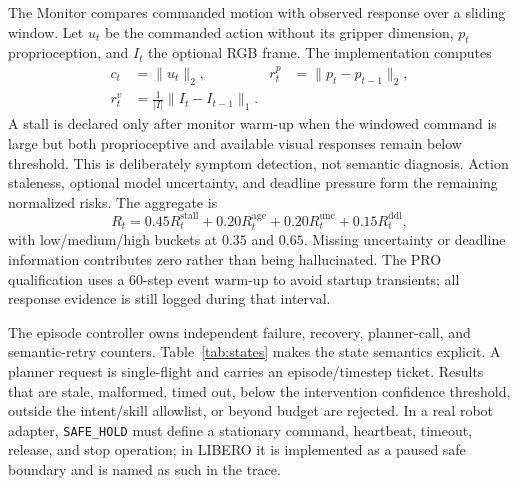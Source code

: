 \documentclass[runningheads]{waica}
\begin{document}
The Monitor compares commanded motion with observed response over a sliding
window. Let $u_t$ be the commanded action without its gripper dimension,
$p_t$ proprioception, and $I_t$ the optional RGB frame. The implementation
computes
\begin{align}
c_t &= \lVert u_t\rVert_2, &
r_t^p &= \lVert p_t-p_{t-1}\rVert_2,\\
r_t^v &= \frac{1}{|I|}\lVert I_t-I_{t-1}\rVert_1.
\end{align}
A stall is declared only after monitor warm-up when the windowed command is
large but both proprioceptive and available visual responses remain below
threshold. This is deliberately symptom detection, not semantic diagnosis.
Action staleness, optional model uncertainty, and deadline pressure form the
remaining normalized risks. The aggregate is
\begin{equation}
R_t = 0.45R_t^{\mathrm{stall}}+0.20R_t^{\mathrm{age}}
      +0.20R_t^{\mathrm{unc}}+0.15R_t^{\mathrm{ddl}},
\label{eq:risk}
\end{equation}
with low/medium/high buckets at $0.35$ and $0.65$. Missing uncertainty or
deadline information contributes zero rather than being hallucinated. The
PRO qualification uses a 60-step event warm-up to avoid startup transients;
all response evidence is still logged during that interval.

The episode controller owns independent failure, recovery, planner-call, and
semantic-retry counters. Table~\ref{tab:states} makes the state semantics
explicit. A planner request is single-flight and carries an episode/timestep
ticket. Results that are stale, malformed, timed out, below the intervention
confidence threshold, outside the intent/skill allowlist, or beyond budget are
rejected. In a real robot adapter, \texttt{SAFE\_HOLD} must define a stationary
command, heartbeat, timeout, release, and stop operation; in LIBERO it is
implemented as a paused safe boundary and is named as such in the trace.
\end{document}
